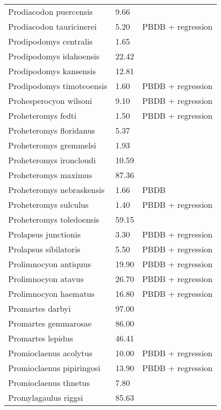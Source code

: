 \documentclass{article}
\begin{document}
\begin{center}
\begin{longtable}{p{} p{} p{}}
    Prodiacodon puercensis & 9.66 & \cite{Mellett1969} \\ 
    Prodiacodon tauricinerei & 5.20 & PBDB + regression \\ 
    Prodipodomys centralis & 1.65 & \cite{Becker1981} \\ 
    Prodipodomys idahoensis & 22.42 & \cite{Tomiya2013} \\ 
    Prodipodomys kansensis & 12.81 & \cite{Tomiya2013} \\ 
    Prodipodomys timoteoensis & 1.60 & PBDB + regression \\ 
    Prohesperocyon wilsoni & 9.10 & PBDB + regression \\ 
    Proheteromys fedti & 1.50 & PBDB + regression \\ 
    Proheteromys floridanus & 5.37 & \cite{Tomiya2013} \\ 
    Proheteromys gremmelsi & 1.93 & \cite{Becker1981} \\ 
    Proheteromys ironcloudi & 10.59 & \cite{Tomiya2013} \\ 
    Proheteromys maximus & 87.36 & \cite{Tomiya2013} \\ 
    Proheteromys nebraskensis & 1.66 & PBDB \\ 
    Proheteromys sulculus & 1.40 & PBDB + regression \\ 
    Proheteromys toledoensis & 59.15 & \cite{Tomiya2013} \\ 
    Prolapsus junctionis & 3.30 & PBDB + regression \\ 
    Prolapsus sibilatoris & 5.50 & PBDB + regression \\ 
    Prolimnocyon antiquus & 19.90 & PBDB + regression \\ 
    Prolimnocyon atavus & 26.70 & PBDB + regression \\ 
    Prolimnocyon haematus & 16.80 & PBDB + regression \\ 
    Promartes darbyi & 97.00 & \cite{Dawson2007} \\ 
    Promartes gemmarosae & 86.00 & \cite{Dawson2007} \\ 
    Promartes lepidus & 46.41 & \cite{Mora2005} \\ 
    Promioclaenus acolytus & 10.00 & PBDB + regression \\ 
    Promioclaenus pipiringosi & 13.90 & PBDB + regression \\ 
    Promioclaenus thnetus & 7.80 & \cite{Gazin1930} \\ 
    Promylagaulus riggsi & 85.63 & \cite{Tomiya2013} \\ 

\end{longtable}
\end{center}
\end{document}
